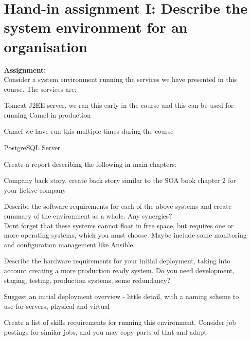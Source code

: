 \documentclass[a4paper,11pt,notitlepage]{report}
\begin{document}
\rm
{}

\newcommand{\course}[1]{KEA System Integration 2020\\ exercises}




\setcounter{tocdepth}{0}

\normal



\chapter*{Hand-in assignment I: Describe the system environment for an organisation}

{\bf Assignment:}\\
Consider a system environment running the services we have presented in this course. The services are:

\begin{list2}
\item Tomcat J2EE server, we ran this early in the course and this can be used for running Camel in production
\item Camel we have run this multiple times during the course
\item PostgreSQL Server
\end{list2}

Create a report describing the following in main chapters:

\begin{list2}
\item Company back story, create back story similar to the SOA book chapter 2 for your fictive company
\item Describe the software requirements for each of the above systems and create summary of the environment as a whole. Any synergies?\\
Dont forget that these systems cannot float in free space, but requires one or more operating systems, which you must choose. Maybe include some monitoring and configuration management like Ansible.
\item Describe the hardware requirements for your initial deployment, taking into account creating a more production ready system. Do you need development, staging, testing, production systems, some redundancy?
\item Suggest an initial deployment overview - little detail, with a naming scheme to use for servers, physical and virtual
\item Create a list of skills requirements for running this environment. Consider job postings for similar jobs, and you may copy parts of that and adapt
\end{list2}
\end{document}
